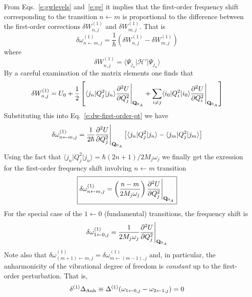 \documentclass[a4paper,titlepage,twoside,fleqn,12pt]{book}
\begin{document}
\begin{refsection}
From Eqs.~\eqref{e:gwlevels} and~\eqref{e:ge} it implies that 
the first-order frequency shift corresponding to the transition
$n\leftarrow m$ 
is proportional to the difference between the first-order corrections 
$\delta W_{n,j}^{(1)}$ and $\delta W_{m,j}^{(1)}$. That is
%
\begin{equation}\label{e:dw-first-order-pt}
\delta \omega_{n\leftarrow m,j}^{(1)} = 
\frac{1}{\hbar} 
\left( \delta W_{n,j}^{(1)} - \delta W_{m,j}^{(1)} \right)
\end{equation}
%
where
%
%
\begin{equation}
\delta W_{n,j}^{(1)} = \langle \Psi_{j_n} \vert \mathscr{H}' \vert \Psi_{j_n} \rangle
\end{equation}
%
By a careful examination of the matrix elements one finds that
%
\begin{equation}
\delta W_{n,j}^{(1)} = U_0 + \frac{1}{2} 
\left[ 
                  \langle j_n \vert Q_j^2 \vert j_n \rangle \frac{\partial^2 U}{\partial Q_j^2} \Bigg|_{{\bf Q}_{0_A}}
  + \sum_{i\ne j} \langle i_0 \vert Q_i^2 \vert i_0 \rangle \frac{\partial^2 U}{\partial Q_i^2} \Bigg|_{{\bf Q}_{0_A}}
\right]
\end{equation}
%
Substituting this into Eq.~\eqref{e:dw-first-order-pt} we have
%
\begin{equation}
\delta \omega_{n\leftarrow m,j}^{(1)} = 
\frac{1}{2\hbar}  \frac{\partial^2 U}{\partial Q_j^2} \Bigg|_{{\bf Q}_{0_A}}
\left[
    \langle j_n \vert Q_j^2 \vert j_n \rangle - \langle j_m \vert Q_j^2 \vert j_m \rangle 
\right]
\end{equation}
%
Using the fact that $\langle j_n \vert Q_j^2 \vert j_n \rangle=\hbar(2n+1)/2M_j\omega_j$
we finally get the exression for the first-order frequency shift involving $n\leftarrow m$
transition
%
\begin{equation}
\label{e:buckingham-1st-order}
\boxed{
\delta \omega_{n\leftarrow m,j}^{(1)} = \left( \frac{n-m}{2M_j\omega_j} \right) 
\frac{\partial^2 U}{\partial Q_j^2} \Bigg|_{{\bf Q}_{0_A}}
}
\end{equation}
%
For the special case of the $1\leftarrow 0$ (fundamental) transitions, the frequency
shift is
%
\begin{equation}
\label{e:buckingham-1st-order-fundamental}
\delta \omega_{1\leftarrow 0,j}^{(1)} =  \frac{1}{2M_j\omega_j}
\frac{\partial^2 U}{\partial Q_j^2} \Bigg|_{{\bf Q}_{0_A}}
\end{equation}
%
Note also that $\delta \omega_{(m+1)\leftarrow m,j}^{(1)} = \delta \omega_{m\leftarrow (m-1),j}^{(1)}$
and, in particular, the anharmonicity of the vibrational degree of freedom is \emph{constant}
up to the first-order perturbation. That is,
%
\begin{equation}  \label{e:anharm-1st-order}
\delta^{(1)} \Delta_{\rm Anh} \equiv \Delta^{(1)} (\omega_{1\leftarrow 0,j} - \omega_{2\leftarrow 1,j}) = 0
\end{equation}
%


\end{refsection}
\end{document}
